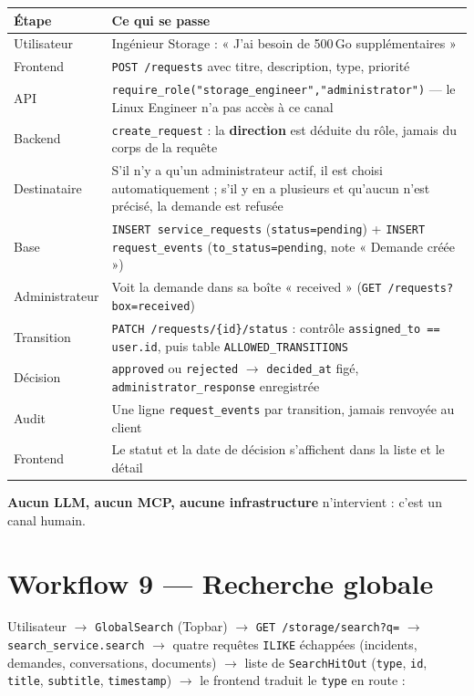 \documentclass[11pt,a4paper]{report}
\newcommand{\fn}[1]{\texttt{\small\textcolor{oasisviolet}{#1}}}
\newcommand{\cls}[1]{\texttt{\small\textcolor{oasisblue}{#1}}}
\newcommand{\tbl}[1]{\texttt{\small\textcolor{oasisamber}{#1}}}
\newcommand{\route}[1]{\texttt{\small\textcolor{oasisgreen}{#1}}}
\newcommand{\arrowto}{\ensuremath{\rightarrow}}
\begin{document}
\begin{longtable}{@{}p{2.9cm}p{11.9cm}@{}}
\toprule
\textbf{Étape} & \textbf{Ce qui se passe}\\
\midrule
\endhead
Utilisateur & Ingénieur Storage : « J'ai besoin de 500\,Go supplémentaires »\\
Frontend & \route{POST /requests} avec titre, description, type, priorité\\
API & \fn{require\_role("storage\_engineer","administrator")} --- le Linux Engineer n'a pas accès à ce canal\\
Backend & \fn{create\_request} : la \textbf{direction} est déduite du rôle, jamais du corps de la requête\\
Destinataire & S'il n'y a qu'un administrateur actif, il est choisi automatiquement ; s'il y en a plusieurs et qu'aucun n'est précisé, la demande est refusée\\
Base & \texttt{INSERT service\_requests} (\texttt{status=pending}) + \texttt{INSERT request\_events} (\texttt{to\_status=pending}, note « Demande créée »)\\
Administrateur & Voit la demande dans sa boîte « received » (\route{GET /requests?box=received})\\
Transition & \route{PATCH /requests/\{id\}/status} : contrôle \texttt{assigned\_to == user.id}, puis table \fn{ALLOWED\_TRANSITIONS}\\
Décision & \texttt{approved} ou \texttt{rejected} \arrowto{} \texttt{decided\_at} figé, \texttt{administrator\_response} enregistrée\\
Audit & Une ligne \tbl{request\_events} par transition, jamais renvoyée au client\\
Frontend & Le statut et la date de décision s'affichent dans la liste et le détail\\
\bottomrule
\end{longtable}

\noindent
\textbf{Aucun LLM, aucun MCP, aucune infrastructure} n'intervient : c'est un
canal humain.

\section{Workflow 9 --- Recherche globale}

Utilisateur \arrowto{} \cls{GlobalSearch} (Topbar) \arrowto{}
\route{GET /storage/search?q=} \arrowto{} \fn{search\_service.search}
\arrowto{} quatre requêtes \texttt{ILIKE} échappées (incidents, demandes,
conversations, documents) \arrowto{} liste de \cls{SearchHitOut}
(\texttt{type}, \texttt{id}, \texttt{title}, \texttt{subtitle},
\texttt{timestamp}) \arrowto{} le frontend traduit le \texttt{type} en route :
\end{document}
